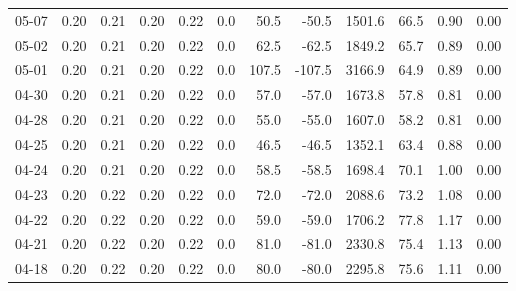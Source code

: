 \begin{threeparttable}
{\begin{tabular}{lrrrrrrrrrrr}
  05-07 &          0.20 &          0.21 &          0.20 &        0.22 &                 0.0 &                50.5 &      -50.5 &              1501.6 &             66.5 &            0.90 &                   0.00 \\
  05-02 &          0.20 &          0.21 &          0.20 &        0.22 &                 0.0 &                62.5 &      -62.5 &              1849.2 &             65.7 &            0.89 &                   0.00 \\
  05-01 &          0.20 &          0.21 &          0.20 &        0.22 &                 0.0 &               107.5 &     -107.5 &              3166.9 &             64.9 &            0.89 &                   0.00 \\
  04-30 &          0.20 &          0.21 &          0.20 &        0.22 &                 0.0 &                57.0 &      -57.0 &              1673.8 &             57.8 &            0.81 &                   0.00 \\
  04-28 &          0.20 &          0.21 &          0.20 &        0.22 &                 0.0 &                55.0 &      -55.0 &              1607.0 &             58.2 &            0.81 &                   0.00 \\
  04-25 &          0.20 &          0.21 &          0.20 &        0.22 &                 0.0 &                46.5 &      -46.5 &              1352.1 &             63.4 &            0.88 &                   0.00 \\
  04-24 &          0.20 &          0.21 &          0.20 &        0.22 &                 0.0 &                58.5 &      -58.5 &              1698.4 &             70.1 &            1.00 &                   0.00 \\
  04-23 &          0.20 &          0.22 &          0.20 &        0.22 &                 0.0 &                72.0 &      -72.0 &              2088.6 &             73.2 &            1.08 &                   0.00 \\
  04-22 &          0.20 &          0.22 &          0.20 &        0.22 &                 0.0 &                59.0 &      -59.0 &              1706.2 &             77.8 &            1.17 &                   0.00 \\
  04-21 &          0.20 &          0.22 &          0.20 &        0.22 &                 0.0 &                81.0 &      -81.0 &              2330.8 &             75.4 &            1.13 &                   0.00 \\
  04-18 &          0.20 &          0.22 &          0.20 &        0.22 &                 0.0 &                80.0 &      -80.0 &              2295.8 &             75.6 &            1.11 &                   0.00 \\

\end{tabular}}
\end{threeparttable}
